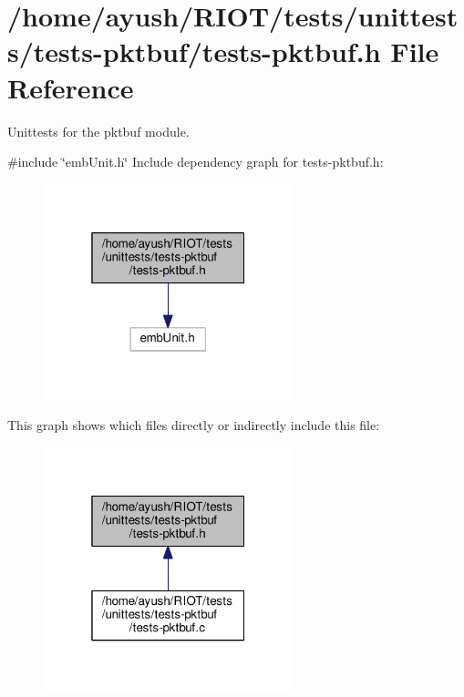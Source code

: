 \hypertarget{tests-pktbuf_8h}{}\section{/home/ayush/\+R\+I\+O\+T/tests/unittests/tests-\/pktbuf/tests-\/pktbuf.h File Reference}
\label{tests-pktbuf_8h}


Unittests for the {\ttfamily pktbuf} module.  


{\ttfamily \#include \char`\"{}emb\+Unit.\+h\char`\"{}}\newline
Include dependency graph for tests-\/pktbuf.h\+:
\nopagebreak
\begin{figure}[H]
\begin{center}
\leavevmode
\includegraphics[width=205pt]{tests-pktbuf_8h__incl}
\end{center}
\end{figure}
This graph shows which files directly or indirectly include this file\+:
\nopagebreak
\begin{figure}[H]
\begin{center}
\leavevmode
\includegraphics[width=205pt]{tests-pktbuf_8h__dep__incl}
\end{center}
\end{figure}
